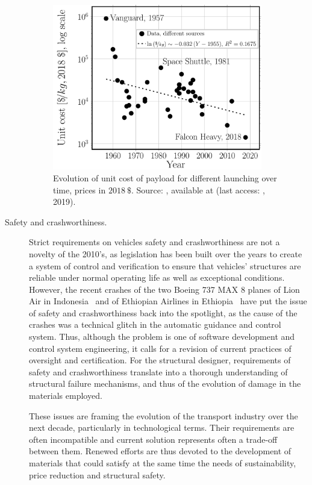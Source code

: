 \begin{description}
\begin{figure}[!h]
\includegraphics[width=0.9\textwidth]{pics/spacetravelcost.pdf}
\caption{Evolution of unit cost of payload for different launching over time, prices in $2018\ \$$. Source: , available at \href{}{} (last access: , 2019).}\label{chap1:fig:spacetravelcost}
\end{figure}

\item[Safety and crashworthiness.] Strict requirements on vehicles safety and crashworthiness are not a novelty of the 2010's, as legislation has been built over the years to create a system of control and verification to ensure that vehicles' structures are reliable under normal operating life as well as exceptional conditions. However, the recent crashes of the two Boeing 737 MAX 8 planes of Lion Air in Indonesia~\cite{aviationSafety2018} and of Ethiopian Airlines in Ethiopia~\cite{aviationSafety2019} have put the issue of safety and crashworthiness back into the spotlight, as the cause of the crashes was a technical glitch in the automatic guidance and control system. Thus, although the problem is one of software development and control system engineering, it calls for a revision of current practices of oversight and certification. For the structural designer, requirements of safety and crashworthiness translate into a thorough understanding of structural failure mechanisms, and thus of the evolution of damage in the materials employed.

These issues are framing the evolution of the transport industry over the next decade, particularly in technological terms. Their requirements are often incompatible and current solution represents often a trade-off between them. Renewed efforts are thus devoted to the development of materials that could satisfy at the same time the needs of sustainability, price reduction and structural safety.


\end{description}
